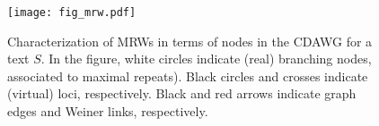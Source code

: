 



\begin{figure}[t]
  \centering 
  \texttt{[image: fig\_mrw.pdf]}
  \caption{Characterization of MRWs in terms of nodes in the CDAWG for a text $S$. In the figure, white circles indicate (real) branching nodes, associated to maximal repeats). Black circles and crosses indicate (virtual) loci, respectively. Black and red arrows indicate graph edges and Weiner links, respectively. 
  }\label{fig:mus}
\end{figure}


